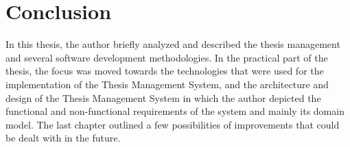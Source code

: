 \chapter{Conclusion}

In this thesis, the author briefly analyzed and described the thesis management and several software development methodologies. In the practical part of the thesis, the focus was moved towards the technologies that were used for the implementation of the Thesis Management System, and the architecture and design of the Thesis Management System in which the author depicted the functional and non-functional requirements of the system and mainly its domain model. The last chapter outlined a few possibilities of improvements that could be dealt with in the future.
